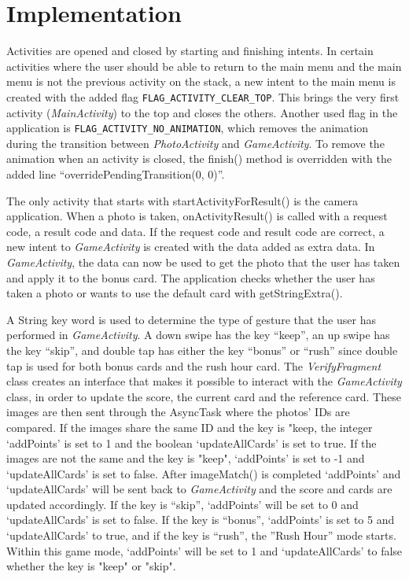 \section{Implementation}
Activities are opened and closed by starting and finishing intents. In certain activities where the user should be able to return to the main menu and the main menu is not the previous activity on the stack, a new intent to the main menu is created with the added flag \verb|FLAG_ACTIVITY_CLEAR_TOP|. This brings the very first activity (\emph{MainActivity}) to the top and closes the others. Another used flag in the application is \verb|FLAG_ACTIVITY_NO_ANIMATION|, which removes the animation during the transition between \emph{PhotoActivity} and \emph{GameActivity}. To remove the animation when an activity is closed, the finish() method is overridden with the added line “overridePendingTransition(0, 0)”. \newline

The only activity that starts with startActivityForResult() is the camera application. When a photo is taken, onActivityResult() is called with a request code, a result code and data. If the request code and result code are correct, a new intent to \emph{GameActivity} is created with the data added as extra data. In \emph{GameActivity}, the data can now be used to get the photo that the user has taken and apply it to the bonus card. The application checks whether the user has taken a photo or wants to use the default card with getStringExtra(). \newline

A String key word is used to determine the type of gesture that the user has performed in \emph{GameActivity}. A down swipe has the key “keep”, an up swipe has the key “skip”, and double tap has either the key “bonus” or “rush” since double tap is used for both bonus cards and the rush hour card.  The \emph{VerifyFragment} class creates an interface that makes it possible to interact with the \emph{GameActivity} class, in order to update the score, the current card and the reference card. These images are then sent through the AsyncTask where the photos' IDs are compared. If the images share the same ID and the key is "keep, the integer `addPoints' is set to 1 and the boolean `updateAllCards' is set to true. If the images are not the same and the key is "keep", `addPoints' is set to -1 and `updateAllCards' is set to false. After imageMatch() is completed `addPoints' and `updateAllCards' will be sent back to \emph{GameActivity} and the score and cards are updated accordingly. If the key is “skip”, `addPoints' will be set to 0 and `updateAllCards' is set to false. If the key is “bonus”, `addPoints' is set to 5 and `updateAllCards' to true, and if the key is “rush”, the ''Rush Hour'' mode starts. Within this game mode, `addPoints' will be set to 1 and `updateAllCards' to false whether the key is "keep" or "skip". \newline

